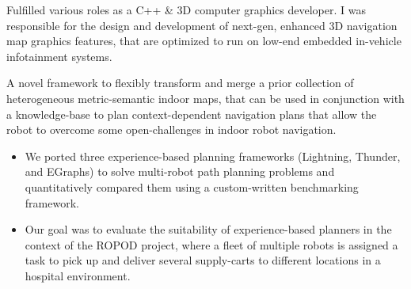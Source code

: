 \documentclass[10pt,a4paper,ragged2e]{altacv}
\begin{document}
Fulfilled various roles as a C++ \& 3D computer graphics developer. I was responsible for the design and development of next-gen, enhanced 3D navigation map graphics features, that are optimized to run on low-end embedded in-vehicle infotainment systems.



A novel framework to flexibly transform and merge a prior collection of heterogeneous metric-semantic indoor maps, that can be used in conjunction with a knowledge-base to plan context-dependent navigation plans that allow the robot to overcome some open-challenges in indoor robot navigation.


\divider


\begin{itemize}
	\item We ported three experience-based planning frameworks (Lightning, Thunder, and EGraphs) to solve multi-robot path planning problems and quantitatively compared them using a custom-written benchmarking framework. 
	\item Our goal was to evaluate the suitability of experience-based planners in the context of the ROPOD project, where a fleet of multiple robots is assigned a task to pick up and deliver several supply-carts to different locations in a hospital environment.
\end{itemize}

\divider

\end{document}
